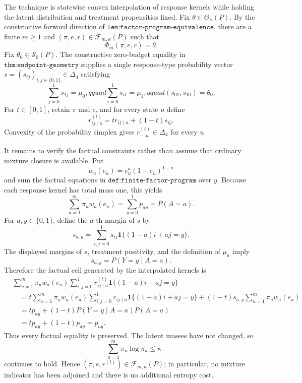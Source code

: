 The technique is statewise convex interpolation of response kernels while holding the latent distribution and treatment propensities fixed.  Fix \(\theta\in\Theta_\kappa(P)\).  By the constructive forward direction of \(\texttt{lem:factor-program-equivalence}\), there are a finite \(m\geq1\) and \((\pi,e,r)\in\mathcal F_{m,\kappa}(P)\) such that
\[
\Phi_m(\pi,e,r)=\theta.
\]
Fix \(\theta_0\in\mathcal S_0(P)\).  The constructive zero-budget equality in \(\texttt{thm:endpoint-geometry}\) supplies a single response-type probability vector \(s=(s_{ij})_{i,j\in\{0,1\}}\in\Delta_4\) satisfying
\[
\sum_{j=0}^1s_{1j}=\mu_0,qquad
\sum_{i=0}^1s_{i1}=\mu_1,qquad
(s_{01},s_{10})=\theta_0.
\]
For \(t\in[0,1]\), retain \(\pi\) and \(e\), and for every state \(u\) define
\[
r^{(t)}_{ij\mid u}=t r_{ij\mid u}+(1-t)s_{ij}.
\]
Convexity of the probability simplex gives \(r^{(t)}_{\cdot\cdot\mid u}\in\Delta_4\) for every \(u\).

It remains to verify the factual constraints rather than assume that ordinary mixture closure is available.  Put
\[
w_a(e_u)=e_u^a(1-e_u)^{1-a}
\]
and sum the factual equations in \(\texttt{def:finite-factor-program}\) over \(y\).  Because each response kernel has total mass one, this yields
\[
\sum_{u=1}^m\pi_u w_a(e_u)=\sum_{y=0}^1p_{ay}=P(A=a).
\]
For \(a,y\in\{0,1\}\), define the \(a\)-th margin of \(s\) by
\[
s_{a,y}=\sum_{i,j=0}^1s_{ij}\mathbf 1\{(1-a)i+aj=y\}.
\]
The displayed margins of \(s\), treatment positivity, and the definition of \(\mu_a\) imply
\[
s_{a,y}=P(Y=y\mid A=a).
\]
Therefore the factual cell generated by the interpolated kernels is
\[
\begin{aligned}
&\sum_{u=1}^m\pi_u w_a(e_u)
 \sum_{i,j=0}^1r^{(t)}_{ij\mid u}\mathbf 1\{(1-a)i+aj=y\}\\
&\quad=t\sum_{u=1}^m\pi_u w_a(e_u)
 \sum_{i,j=0}^1r_{ij\mid u}\mathbf 1\{(1-a)i+aj=y\}
 +(1-t)s_{a,y}\sum_{u=1}^m\pi_u w_a(e_u)\\
&\quad=t p_{ay}+(1-t)P(Y=y\mid A=a)P(A=a)\\
&\quad=t p_{ay}+(1-t)p_{ay}=p_{ay}.
\end{aligned}
\]
Thus every factual equality is preserved.  The latent masses have not changed, so
\[
-\sum_{u=1}^m\pi_u\log\pi_u\leq\kappa
\]
continues to hold.  Hence \((\pi,e,r^{(t)})\in\mathcal F_{m,\kappa}(P)\); in particular, no mixture indicator has been adjoined and there is no additional entropy cost.

